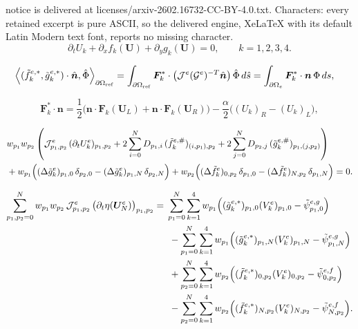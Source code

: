 \documentclass[10pt,a4paper]{amsart}
\begin{document}
notice is delivered at licenses/arxiv-2602.16732-CC-BY-4.0.txt. Characters: every retained excerpt is pure ASCII, so the delivered engine, XeLaTeX with its default Latin Modern text font, reports no missing character.
\begin{equation}
\label{euler-c}
\partial_t U_k + \partial_x f_k(\bm U) + \partial_y g_k(\bm U) = 0,
\qquad k=1,2,3,4.
\end{equation}

\begin{align}
\label{eq_map}
\left\langle (\Tilde{f}_k^{e,*},\Tilde{g}_k^{e,*})\cdot \hat{\bm n}, \hat\Phi \right\rangle_{\partial\Omega_{\mathrm{ref}}}
&=
\int_{\partial\Omega_{\mathrm{ref}}}
\boldsymbol F_k^{*} \cdot
\bigl(\mathcal{J}^e(\mathcal{G}^e)^{-T} \hat{\boldsymbol n}\bigr)\,
\hat\Phi\, d\hat s =
\int_{\partial\Omega_e}
\boldsymbol F_k^{*} \cdot \boldsymbol n\, \Phi\, ds,
\end{align}

\begin{equation}
\label{eq:llf_normal_flux}
\boldsymbol F_k^{*} \cdot \boldsymbol n
=
\frac12\Big(
\boldsymbol n \cdot \boldsymbol F_k(\boldsymbol U_L)
+
\boldsymbol n \cdot \boldsymbol F_k(\boldsymbol U_R)
\Big)
-
\frac{\alpha}{2}\Big(
(U_k)_R - (U_k)_L
\Big),
\end{equation}

\begin{equation}
\label{eq_esdgsem}
\begin{aligned}
&w_{p_1}w_{p_2}\left(\mathcal{J}_{p_1,p_2}^e\,(\partial_tU_k^e)_{p_1,p_2}
+
2\sum_{i=0}^N D_{p_1,i}\,(\tilde{f}_k^{e,\#})_{(i,p_1),p_2}
+
2
\sum_{j=0}^N D_{p_2,j}\,(\tilde{g}_k^{e,\#})_{p_1,(j,p_2)}\right)\\
&+
w_{p_1}\Bigl(
(\Delta\tilde g_k^e)_{p_1,0}\,\delta_{p_2,0}
-
(\Delta\tilde g_k^e)_{p_1,N}\,\delta_{p_2,N}
\Bigr)
+
w_{p_2}\Bigl(
(\Delta\tilde f_k^e)_{0,p_2}\,\delta_{p_1,0}
-
(\Delta\tilde f_k^e)_{N,p_2}\,\delta_{p_1,N}
\Bigr)
=0.
\end{aligned}
\end{equation}

\begin{equation}
\label{eq_ss}
\begin{aligned}
\sum_{p_1,p_2=0}^N
w_{p_1} w_{p_2}\,
\mathcal{J}_{p_1,p_2}^e\,
\bigl(\partial_t \eta(\bm U_N^e)\bigr)_{p_1,p_2}
= {} &
\sum_{p_1=0}^N \sum_{k=1}^4
w_{p_1}
\Bigl(
(\tilde g_k^{e,*})_{p_1,0} (V_k^e)_{p_1,0}
-
\tilde\psi^{e,g}_{p_1,0}
\Bigr) \\
&\; -
\sum_{p_1=0}^N \sum_{k=1}^4
w_{p_1}
\Bigl(
(\tilde g_k^{e,*})_{p_1,N} (V_k^e)_{p_1,N}
-
\tilde\psi^{e,g}_{p_1,N}
\Bigr) \\
&\; +
\sum_{p_2=0}^N \sum_{k=1}^4
w_{p_2}
\Bigl(
(\tilde f_k^{e,*})_{0,p_2} (V_k^e)_{0,p_2}
-
\tilde\psi^{e,f}_{0,p_2}
\Bigr) \\
&\; -
\sum_{p_2=0}^N \sum_{k=1}^4
w_{p_2}
\Bigl(
(\tilde f_k^{e,*})_{N,p_2} (V_k^e)_{N,p_2}
-
\tilde\psi^{e,f}_{N,p_2}
\Bigr).
\end{aligned}
\end{equation}
\end{document}
